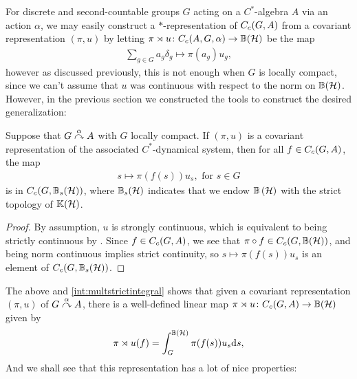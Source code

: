 For discrete and second-countable groups $G$ acting on a $C^*$-algebra $A$ via an action $\alpha$, we may easily construct a $*$-representation of $C_c(G,A)$ from a covariant representation $(\pi,u)$ by letting $\pi \rtimes u \colon C_c(A,G,\alpha) \to \mathbb{B}(\mathcal{H})$ be the map
\begin{align*}
\sum_{g \in G} a_g \delta_g \mapsto \pi(a_g) u_g,
\end{align*}
however as discussed previously, this is not enough when $G$ is locally compact, since we can't assume that $u$ was continuous with respect to the norm on $\mathbb{B}(\mathcal{H})$. However, in the previous section we constructed the tools to construct the desired generalization:
\begin{lemma}
Suppose that $G \stackrel{\alpha}{\curvearrowright} A$ with $G$ locally compact. If $(\pi,u)$ is a covariant representation of the associated $C^*$-dynamical system, then for all $f \in C_c(G,A)$, the map
\begin{align*}
	s \mapsto \pi(f(s)) u_s, \text{ for }s \in G
\end{align*}
is in $C_c(G,\mathbb{B}_s(\mathcal{H}))$, where $\mathbb{B}_s(\mathcal{H})$ indicates that we endow $\mathbb{B}\left(\mathcal{H} \right)$ with the strict topology of $ \mathbb{K}(\mathcal{H})$.
\label{cross:integrandcont}
\end{lemma}
\begin{proof}
By assumption, $u$ is strongly continuous, which is equivalent to being strictly continuous by . Since $f \in C_c(G,A)$, we see that $\pi \circ f \in C_c(G,\mathbb{B}(\mathcal{H}))$, and being norm continuous implies strict continuity, so $s \mapsto \pi(f(s)) u_s$ is an element of $C_c(G,\mathbb{B}_s(\mathcal{H}))$.
\end{proof}
The above and \ref{int:multstrictintegral} shows that given a covariant representation $(\pi,u)$ of $G \stackrel{\alpha}{\curvearrowright} A$, there is a well-defined linear map $\pi \rtimes u \colon C_c(G,A) \to \mathbb{B}(\mathcal{H})$ given by
\begin{align*}
\pi \rtimes u (f) = \int_G^{\mathbb{B}(\mathcal{H})} \pi(f(s)) u_s \mathrm{d} s,
\end{align*}
And we shall see that this representation has a lot of nice properties:

